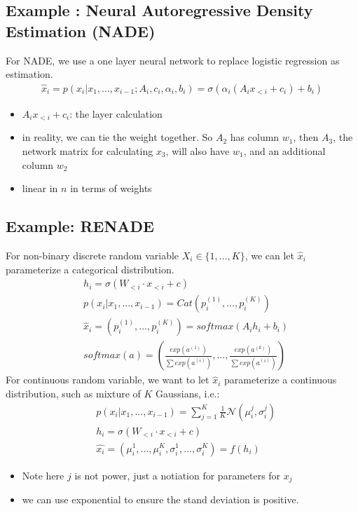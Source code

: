 \subsection{Example : Neural Autoregressive Density Estimation (NADE)}
For NADE, we use a one layer neural network to replace logistic regression as estimation. 
    \begin{align*}
        \hat{x}_i = p(x_i | x_1,...,x_{i-1}; A_i, c_i, \alpha_i, b_i) = \sigma(\alpha_i (A_i x_{<i} + c_i) + b_i)
    \end{align*}
    \begin{itemize}
        \item $A_i x_{<i} + c_i$: the layer calculation 
        \item in reality, we can tie the weight together. So $A_2$ has column $w_1$, then $A_3$, the network matrix for calculating $x_3$, will also have $w_1$, and an additional column $w_2$
        \item linear in $n$ in terms of weights 
    \end{itemize}


\subsection{Example: RENADE} 
For non-binary discrete random variable $X_i \in \{1, ..., K\}$, we can let $\hat{x}_i$ parameterize a categorical distribution. 
    \begin{align*}
        & h_i = \sigma (W_{<i} \cdot x_{<i} + c) \\
        & p(x_i|x_1,...,x_{i-1}) = Cat(p_i^{(1)},...,p_i^{(K)})\\
        & \hat{x}_i = (p_i^{(1)},...,p_i^{(K)}) = softmax(A_ih_i + b_i) \\
        & softmax(a) = (\frac{exp(a^{(1)})}{\sum exp(a^{(i)})}, ...,\frac{exp(a^{(k)})}{\sum exp(a^{(i)})})
    \end{align*}
For continuous random variable, we want to let $\hat{x}_i$ parameterize a continuous distribution, such as mixture of $K$ Gaussians, i.e.: 
    \begin{align*}
        & p(x_i | x_1, ..., x_{i-1}) = \sum_{j=1}^K \frac{1}{K} \mathcal{N}(\mu_i^j, \sigma_i^j)\\
        & h_i = \sigma(W_{<i} \cdot x_{<i} + c)\\
        & \hat{x_i} = (\mu_i^1, ..., \mu_i^K, \sigma_i^1,...,\sigma_i^K) = f(h_i)
    \end{align*}
    \begin{itemize}
        \item Note here $j$ is not power, just a notiation for parameters for $x_j$
        \item we can use exponential to ensure the stand deviation is positive.
    \end{itemize}

